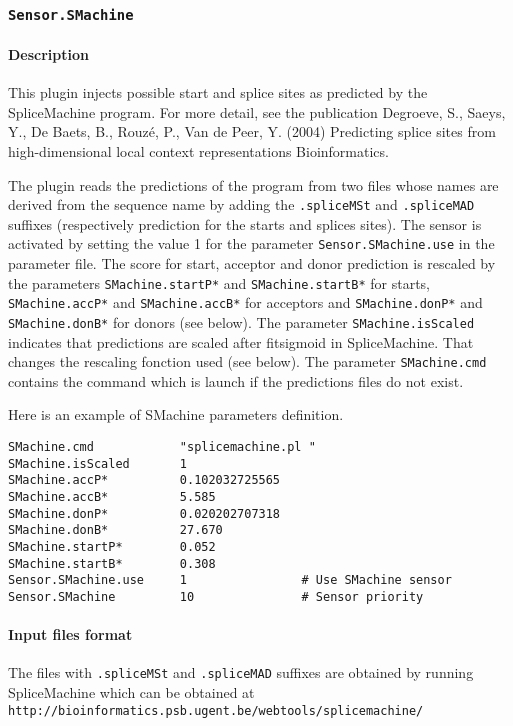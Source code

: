 
\subsubsection{\texttt{Sensor.SMachine}}


\paragraph{Description}

This plugin injects possible start and splice sites as predicted by the
SpliceMachine program. For more detail, see the publication Degroeve, S., Saeys, Y., De Baets, B., Rouz\'e, P., Van de Peer, Y. (2004) Predicting splice sites from high-dimensional local context representations Bioinformatics. 

The plugin reads the predictions of the
program from two files whose names are derived from the sequence name
by adding the \texttt{.spliceMSt} and \texttt{.spliceMAD} suffixes
(respectively prediction for the starts and splices sites).
The sensor is activated by setting the value 1 for the parameter
\texttt{Sensor.SMachine.use} in the parameter file. The score for start, acceptor
and donor prediction is rescaled by the parameters {\tt SMachine.startP*} and
{\tt SMachine.startB*} for starts,  {\tt SMachine.accP*} and
{\tt SMachine.accB*} for acceptors and {\tt SMachine.donP*} and {\tt SMachine.donB*} for donors (see below).
The parameter {\tt SMachine.isScaled} indicates that predictions are scaled after fitsigmoid in SpliceMachine. That changes the rescaling fonction used (see below).
The parameter {\tt SMachine.cmd} contains the command which is launch if the predictions files do not exist.


Here is an example of SMachine parameters definition.
\begin{Verbatim}[fontsize=\small]
SMachine.cmd            "splicemachine.pl "
SMachine.isScaled       1
SMachine.accP*          0.102032725565
SMachine.accB*          5.585
SMachine.donP*          0.020202707318
SMachine.donB*          27.670
SMachine.startP*        0.052
SMachine.startB*        0.308
Sensor.SMachine.use     1                # Use SMachine sensor
Sensor.SMachine         10               # Sensor priority
\end{Verbatim}



\paragraph{Input files format}
The files with \texttt{.spliceMSt} and \texttt{.spliceMAD} suffixes are
obtained by running SpliceMachine which can be obtained at \\
\texttt{http://bioinformatics.psb.ugent.be/webtools/splicemachine/}

